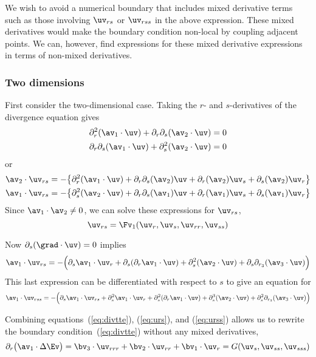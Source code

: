 We wish to avoid a numerical boundary that includes mixed derivative terms such as those involving
$\uv_{rs}$ or $\uv_{rss}$ in the above expression. These mixed derivatives would make the 
boundary condition non-local by coupling adjacent points. We can, however, find expressions
for these mixed derivative expressions in terms of non-mixed derivatives.

\subsubsection{Two dimensions}

First consider the two-dimensional case.
Taking the $r$- and $s$-derivatives of the divergence equation gives
\begin{align*}
   \partial_r^2(\av_1\cdot\uv) + \partial_r\partial_s(\av_2\cdot\uv) &=0 \\
   \partial_r\partial_s(\av_1\cdot\uv) + \partial_s^2(\av_2\cdot\uv) &=0
\end{align*}
or
\begin{align*}
 \av_2\cdot\uv_{rs} &= -\big\{ \partial_r^2(\av_1\cdot\uv) + \partial_r\partial_s(\av_2)\uv 
                  + \partial_r(\av_2)\uv_s + \partial_s(\av_2)\uv_r\big\}   \\
 \av_1\cdot\uv_{rs} &= -\big\{ \partial_s^2(\av_2\cdot\uv) + \partial_r\partial_s(\av_1)\uv 
                     + \partial_r(\av_1)\uv_s + \partial_s(\av_1)\uv_r  \big\} 
\end{align*}
Since $\av_1\cdot\av_2\ne 0$, we can solve these expressions for $\uv_{rs}$,
\begin{equation}
   \uv_{rs} = \Fv_1(\uv_r,\uv_s,\uv_{rr},\uv_{ss})  \label{eq:urs}
\end{equation}

Now $\partial_s(\grad\cdot\uv)=0$ implies
\[
   \av_1 \cdot \uv_{rs} = -\Big( \partial_s\av_1\cdot\uv_r +
       \partial_s( \partial_r\av_1\cdot\uv) + \partial_s^2(\av_2\cdot\uv)+ \partial_s\prc(\av_3\cdot\uv) \Big)
\]
This last expression can be differentiated with respect to $s$ to give an equation
for 
\begin{equation}
\av_1 \cdot \uv_{rss} =  -\Big( \partial_s\av_1\cdot\uv_{rs} + \partial_s^2\av_1\cdot\uv_{r} +
       \partial_s^2( \partial_r\av_1\cdot\uv) + \partial_s^3(\av_2\cdot\uv)
           + \partial_s^2\prc(\av_3\cdot\uv) \Big)  \label{eq:urss}
\end{equation}

Combining equations~(\ref{eq:divtte}), (\ref{eq:urs}), and (\ref{eq:urss}) allows us to rewrite
the boundary condition~(\ref{eq:divtte}) without any mixed derivatives,
\begin{equation}
  \partial_r\big(\av_1\cdot \Delta\Ev \big) =
    \bv_3\cdot\uv_{rrr} + \bv_2\cdot\uv_{rr} + \bv_1\cdot\uv_{r} = G(\uv_s,\uv_{ss},\uv_{sss})
\end{equation}

